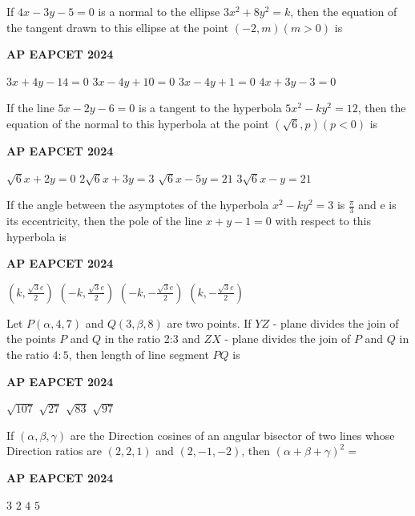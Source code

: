 \documentclass[11pt,paper=a4,answers]{exam}
\begin{document}
\begin{multicols}{2}
\begin{questions}
\question
If $4 x-3 y-5=0$ is a normal to the ellipse $3 x^2+8 y^2=k$, then the equation of the tangent drawn to this ellipse at the point $(-2, m)(m>0)$ is
\begin{flushright}
\small\textbf{AP EAPCET 2024}
\end{flushright}
\begin{choices}
  \choice $3 x+4 y-14=0$
  \choice $3 x-4 y+10=0$
  \choice $3 x-4 y+1=0$
  \choice $4 x+3 y-3=0$
\end{choices}

\question
If the line $5 x-2 y-6=0$ is a tangent to the hyperbola $5 x^2-k y^2=12$, then the equation of the normal to this hyperbola at the point $(\sqrt{6}, p)(p<0)$ is
\begin{flushright}
\small\textbf{AP EAPCET 2024}
\end{flushright}
\begin{choices}
  \choice $\sqrt{6} x+2 y=0$
  \choice $2\sqrt{6} x+3 y=3$ 
  \choice $\sqrt{6} x-5 y=21$ 
  \choice $3\sqrt{6} x- y=21$
\end{choices}

\question
If the angle between the asymptotes of the hyperbola $x^2-k y^2=3$ is $\frac{\pi}{3}$ and e is its eccentricity, then the pole of the line $x+y-1=0$ with respect to this hyperbola is
\begin{flushright}
\small\textbf{AP EAPCET 2024}
\end{flushright}
\begin{choices}
  \choice $\left(k, \frac{\sqrt{3} e}{2}\right)$
  \choice $\left(-k, \frac{\sqrt{3} e}{2}\right)$ 
  \choice $\left(-k,- \frac{\sqrt{3} e}{2}\right)$ 
  \choice $\left(k, - \frac{\sqrt{3} e}{2}\right)$
\end{choices}

\question
Let $P(\alpha, 4,7)$ and $Q(3, \beta, 8)$ are two points. If $Y Z$ - plane divides the join of the points $P$ and $Q$ in the ratio 2:3 and $Z X$ - plane divides the join of $P$ and $Q$ in the ratio $4: 5$, then length of line segment $P Q$ is
\begin{flushright}
\small\textbf{AP EAPCET 2024}
\end{flushright}
\begin{choices}
  \choice $\sqrt{107}$
  \choice $\sqrt{27}$ 
  \choice $\sqrt{83}$ 
  \choice $\sqrt{97}$
\end{choices}

\question
If $(\alpha, \beta, \gamma)$ are the Direction cosines of an angular bisector of two lines whose Direction ratios are $(2,2,1)$ and $(2,-1,-2)$, then $(\alpha+\beta+\gamma)^2=$
\begin{flushright}
\small\textbf{AP EAPCET 2024}
\end{flushright}
\begin{choices}
  \choice $3$
  \choice $2$ 
  \choice $4$ 
  \choice $5$
\end{choices}


\end{questions}
\end{multicols}
\end{document}
